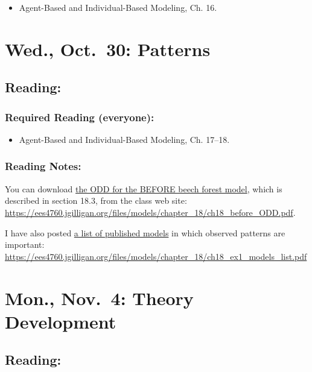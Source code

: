\documentclass[
]{article}
\providecommand{\tightlist}{%
  \setlength{\itemsep}{0pt}\setlength{\parskip}{0pt}}
\begin{document}
\begin{itemize}
\tightlist
\item
  Agent-Based and Individual-Based Modeling, Ch. 16.
\end{itemize}

\section{Wed., Oct.~30: Patterns}\label{wed.-oct.-30-patterns}

\subsection{Reading:}\label{reading-19}

\subsubsection{Required Reading
(everyone):}\label{required-reading-everyone-16}

\begin{itemize}
\tightlist
\item
  Agent-Based and Individual-Based Modeling, Ch. 17--18.
\end{itemize}

\subsubsection{Reading Notes:}\label{reading-notes-14}

You can download \href{/files/models/chapter_18/ch18_before_ODD.pdf}{the
ODD for the BEFORE beech forest model}, which is described in section
18.3, from the class web site:
\url{https://ees4760.jgilligan.org/files/models/chapter_18/ch18_before_ODD.pdf}.

I have also posted
\href{/files/models/chapter_18/ch18_ex1_models_list.pdf}{a list of
published models} in which observed patterns are important:
\url{https://ees4760.jgilligan.org/files/models/chapter_18/ch18_ex1_models_list.pdf}

\section{Mon., Nov.~4: Theory
Development}\label{mon.-nov.-4-theory-development}

\subsection{Reading:}\label{reading-20}
\end{document}
